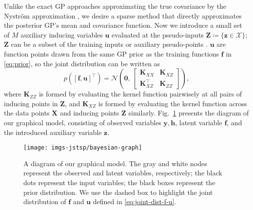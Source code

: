 \documentclass[journal]{IEEEtran}
\begin{document}
Unlike the exact GP approaches approximating the true covariance by the Nystr\"{o}m approximation \cite{rasmussen2003gaussian},
we desire a sparse method that directly approximates the posterior GP's mean and covariance function.
Now we introduce a small set of $M$ auxiliary inducing variables $\mathbf{u}$ evaluated at the pseudo-inputs $\mathbf{Z} \coloneqq \{\mathbf{z} \in \mathscr{X}\}$;
$\mathbf{Z}$ can be a subset of the training inputs or auxiliary pseudo-points \cite{snelson2005sparse}.
$\mathbf{u}$ are function points drawn from the same GP prior as the training functions $\mathbf{f}$ in \eqref{eq:prior}, so the joint distribution can be written as
\begin{equation}
    p([\mathbf{f}, \mathbf{u}]^\top) = \mathcal{N}\left(
    \mathbf{0},~
    \begin{bmatrix}
    \mathbf{K}_{XX} & \mathbf{K}_{XZ} \\
    \mathbf{K}_{XZ}^\top & \mathbf{K}_{ZZ}
    \end{bmatrix}
    \right),
    \label{eq:joint-dist-f-u}
\end{equation}
where $\mathbf{K}_{ZZ}$ is formed by evaluating the kernel function pairwisely at all pairs of inducing points in $\mathbf{Z}$, and $\mathbf{K}_{XZ}$ is formed by evaluating the kernel function across the data points $\mathbf{X}$ and inducing points $\mathbf{Z}$ similarly. 
Fig.~\ref{fig:model-illustration} presents the diagram of our graphical model, consisting of observed variables $\mathbf{y}, \mathbf{h}$, latent variable $\mathbf{f}$, and the introduced auxiliary variable $\mathbf{z}$.

\begin{figure}[!t]
\centering
\texttt{[image: imgs-jstsp/bayesian-graph]}
\caption{A diagram of our graphical model. The gray and white nodes represent the observed and latent variables, respectively; the black dots represent the input variables; the black boxes represent the prior distribution. We use the dashed box to highlight the joint distribution of $\mathbf{f}$ and $\mathbf{u}$ defined in \eqref{eq:joint-dist-f-u}.}
\label{fig:model-illustration}
\end{figure}
\end{document}
